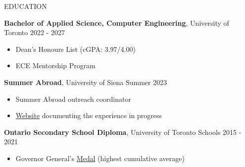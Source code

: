 \documentclass{resume} %
\begin{document}



\begin{rSection}{EDUCATION}

    {\bf Bachelor of Applied Science, Computer Engineering}, University of Toronto \hfill {2022 - 2027}
    \vspace{-0.2cm}
    \begin{itemize}
     \itemsep -8pt {} 
      \item  Dean's Honours List (cGPA: 3.97/4.00)
      \item  ECE Mentorship Program
    \end{itemize}

    {\bf Summer Abroad}, University of Siena \hfill {Summer 2023}
    \vspace{-0.2cm}
    \begin{itemize}
     \itemsep -8pt {} 
      \item  Summer Abroad outreach coordinator
      \item  \href{https://github.com/endothermiic/serendipity}{Website} documenting the experience in progress
    \end{itemize}

    {\bf Ontario Secondary School Diploma}, University of Toronto Schools \hfill {2015 - 2021}
    \vspace{-0.2cm}
    \begin{itemize}
     \itemsep -8pt {} 
      \item  Governor General’s \href{https://www.gg.ca/en/honours/recipients/116-110249}{Medal} (highest cumulative average)
    \end{itemize}

\end{rSection}
\end{document}

